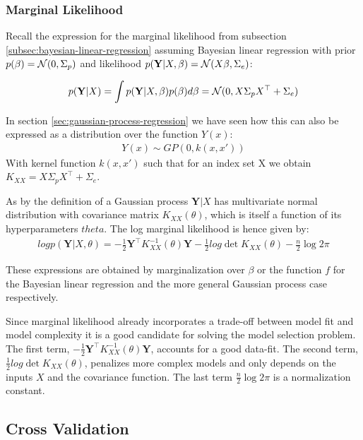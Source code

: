 \subsubsection{Marginal Likelihood}

Recall the expression for the marginal likelihood from subsection \ref{subsec:bayesian-linear-regression}
assuming Bayesian linear regression with prior $p(\beta) = \operatorname{\mathcal{N}}(0, \Sigma_p)$ and likelihood
$p(\mathbf{Y} | X, \beta) = \operatorname{\mathcal{N}}(X \beta, \Sigma_e)$:

\begin{gather}\label{eq:marginal-likelihood2}
    p(\mathbf{Y}|X) = \int p(\mathbf{Y}|X,\beta) p(\beta) d\beta = \operatorname{\mathcal{N}}(0, X \Sigma_p X^{\top} + \Sigma_e)
\end{gather}

In section \ref{sec:gaussian-process-regression} we have seen how this can also be expressed
as a distribution over the function $Y(x)$:
\begin{gather*}
    Y(x) \sim GP(0, k(x, x'))
\end{gather*}
With kernel function $k(x,x')$ such that for an index set X we obtain $K_{XX} =  X \Sigma_p X^{\top} + \Sigma_e$.

As by the definition of a Gaussian process $\mathbf{Y}|X$ has multivariate normal distribution
with covariance matrix $K_{XX}(\theta)$, which is itself a function of its hyperparameters $theta$.
The log marginal likelihood is hence given by:
\begin{gather}\label{eq:gaussian-marginal-likelihood}
    log p(\mathbf{Y} | X, \theta) = - \frac{1}{2} \mathbf{Y}^{\top} K_{XX}^{-1}(\theta) \mathbf{Y} -
    \frac{1}{2} log \det{K_{XX}(\theta)} - \frac{n}{2} \log 2 \pi
\end{gather}

These expressions are obtained by marginalization over $\beta$ or the function $f$
for the Bayesian linear regression and the more general Gaussian process case respectively.

Since marginal likelihood already incorporates a trade-off between model fit and
model complexity it is a good candidate for solving the model selection problem.
The first term, $- \frac{1}{2} \mathbf{Y}^{\top} K_{XX}^{-1}(\theta) \mathbf{Y}$,
accounts for a good data-fit. The second term, $\frac{1}{2} log \det{K_{XX}(\theta)}$,
penalizes more complex models and only depends on the inputs $X$ and the covariance function. The
last term $\frac{n}{2} \log 2 \pi$ is a normalization constant.


\subsection{Cross Validation}








